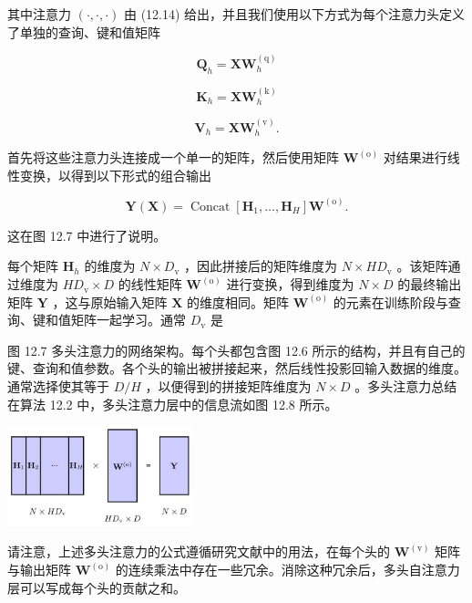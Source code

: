 \documentclass[10pt]{report}
\begin{document}
其中注意力 \(\left( {\cdot ,\cdot , \cdot  }\right)\) 由 (12.14) 给出，并且我们使用以下方式为每个注意力头定义了单独的查询、键和值矩阵

\[
{\mathbf{Q}}_{h} = {\mathbf{{XW}}}_{h}^{\left( \mathrm{q}\right) } \tag{12.16}
\]

\[
{\mathbf{K}}_{h} = \mathbf{X}{\mathbf{W}}_{h}^{\left( \mathrm{k}\right) } \tag{12.17}
\]

\[
{\mathbf{V}}_{h} = \mathbf{X}{\mathbf{W}}_{h}^{\left( \mathrm{v}\right) }. \tag{12.18}
\]

首先将这些注意力头连接成一个单一的矩阵，然后使用矩阵 \({\mathbf{W}}^{\left( \mathrm{o}\right) }\) 对结果进行线性变换，以得到以下形式的组合输出

\[
\mathbf{Y}\left( \mathbf{X}\right)  = \operatorname{Concat}\left\lbrack  {{\mathbf{H}}_{1},\ldots ,{\mathbf{H}}_{H}}\right\rbrack  {\mathbf{W}}^{\left( \mathrm{o}\right) }. \tag{12.19}
\]

这在图 12.7 中进行了说明。

每个矩阵 \({\mathbf{H}}_{h}\) 的维度为 \(N \times  {D}_{\mathrm{v}}\) ，因此拼接后的矩阵维度为 \(N \times  H{D}_{\mathrm{v}}\) 。该矩阵通过维度为 \(H{D}_{\mathrm{v}} \times  D\) 的线性矩阵 \({\mathbf{W}}^{\left( \mathrm{o}\right) }\) 进行变换，得到维度为 \(N \times  D\) 的最终输出矩阵 \(\mathbf{Y}\) ，这与原始输入矩阵 \(\mathbf{X}\) 的维度相同。矩阵 \({\mathbf{W}}^{\left( \mathrm{o}\right) }\) 的元素在训练阶段与查询、键和值矩阵一起学习。通常 \({D}_{\mathrm{v}}\) 是

图 12.7 多头注意力的网络架构。每个头都包含图 12.6 所示的结构，并且有自己的键、查询和值参数。各个头的输出被拼接起来，然后线性投影回输入数据的维度。通常选择使其等于 \(D/H\) ，以便得到的拼接矩阵维度为 \(N \times  D\) 。多头注意力总结在算法 12.2 中，多头注意力层中的信息流如图 12.8 所示。

\begin{center}
\includegraphics[max width=0.4\textwidth]{images/0194e279-9b28-703a-88f4-c3ac21e2010d_387_944_347_607_330_0.jpg}
\end{center}
\hspace*{3em} 

请注意，上述多头注意力的公式遵循研究文献中的用法，在每个头的 \({\mathbf{W}}^{\left( \mathrm{v}\right) }\) 矩阵与输出矩阵 \({\mathbf{W}}^{\left( \mathrm{o}\right) }\) 的连续乘法中存在一些冗余。消除这种冗余后，多头自注意力层可以写成每个头的贡献之和。
\end{document}

